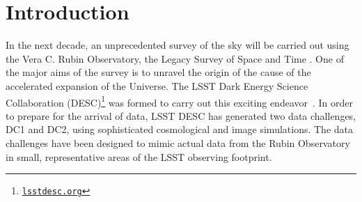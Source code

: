 \documentclass[modern]{descnote}
\newcommand*{\https}[1]{\href{https://#1}{\nolinkurl{#1}}}
\begin{document}
\begin{abstract}


\clearpage
\end{abstract}

\tableofcontents

\clearpage

\section{Introduction}

In the next decade, an unprecedented survey of the sky will be carried out using the Vera C. Rubin Observatory, the Legacy Survey of Space and Time \citep{2009arXiv0912.0201L,2019ApJ...873..111I}. One of the major aims of the survey is to unravel the origin of the cause of the accelerated expansion of the Universe. The LSST Dark Energy Science Collaboration (DESC)\footnote{\https{lsstdesc.org}} was formed to carry out this exciting endeavor~\citep{Abate:2012za}. In order to prepare for the arrival of data, LSST DESC has generated two data challenges, DC1 and DC2, using sophisticated cosmological and  image simulations. The data challenges have been designed to mimic actual data from the Rubin Observatory in small, representative areas of the LSST observing footprint.
\end{document}
